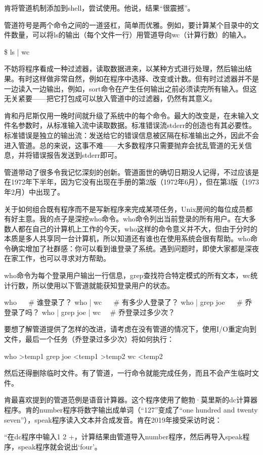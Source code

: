 \documentclass[a4paper,12pt,UTF8,twoside]{ctexbook}
\begin{document}
{肯将管道机制添加到shell，尝试使用。他说，结果“很震撼”。

管道符号是两个命令之间的一道竖杠，简单而优雅。例如，要计算某个目录中的文件数量，可以将ls的输出（每个文件一行）用管道导向wc（计算行数）的输入。

\$ ls | wc

不妨将程序看成一种过滤器，读取数据进来，以某种方式进行处理，然后输出结果。有时这样做非常自然，例如在程序中选择、改变或计数。但有时过滤器并不是一边读入一边输出，例如，sort命令在产生任何输出之前必须读完所有输入。但这无关紧要——把它打包成可以放入管道中的过滤器，仍然有其意义。

肯和丹尼斯仅用一晚时间就升级了系统中的每个命令。最大的改变是，在未输入文件名参数时，从标准输入流中读取数据。标准错误流stderr的创造也有其必要性。标准错误是独立的输出流：发送给它的错误信息被区隔在标准输出之外，因此不会进入管道。总的来说，这事不难——大多数程序只需要抛弃会扰乱管道的无关信息，并将错误报告发送到stderr即可。

管道带动了很多令我记忆深刻的创新。管道面世的确切日期没人记得，不过应该是在1972年下半年，因为它没有出现在手册的第2版（1972年6月），但在第3版（1973年2月）中出现了。

关于如何组合既有程序而不是写新程序来完成某项任务，Unix房间的每位成员都有好主意。我的点子是深挖who命令。who命令列出当前登录的所有用户。在大多数人都在自己的计算机上工作的今天，who这样的命令意义并不大，但由于分时的本质是多人共享同一台计算机，所以知道还有谁也在使用系统会很有帮助。who命令确实增加了社群感：你可以看到谁登录了系统。遇到问题时，即使大家都是深夜在家工作，也可以寻求对方帮助。

who命令为每个登录用户输出一行信息，grep查找符合特定模式的所有文本，wc统计行数，所以使用以下管道就能获知登录用户的状态。

who   \# 谁登录了？ who | wc   \# 有多少人登录了？ who | grep joe   \# 乔登录了吗？ who | grep joe | wc  \# 乔登录过多少次？

要想了解管道提供了怎样的改进，请考虑在没有管道的情况下，使用I/O重定向到文件，最后一个任务（乔登录过多少次）将如何执行：

who >temp1 grep joe <temp1 >temp2 wc <temp2

然后还得删除临时文件。有了管道，一行命令就能完成任务，而且不会产生临时文件。

肯最喜欢提到的管道范例是语音计算器。这个程序使用了鲍勃·莫里斯的dc计算器程序。肯的number程序将数字输出成单词（“127”变成了“one hundred and twenty seven”），speak程序读入文本并合成发音。肯在2019年接受采访时说：

“在dc程序中输入1 2 +，计算结果由管道导入number程序，然后再导入speak程序，speak程序就会说出‘four’。

}
\end{document}
